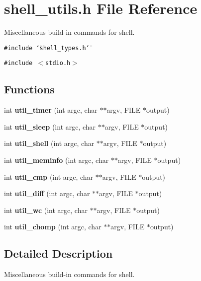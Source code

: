 \section{shell\_\-utils.h File Reference}
\label{shell__utils_8h}
Miscellaneous build-in commands for shell. 

{\tt \#include \char`\"{}shell\_\-types.h\char`\"{}}\par
{\tt \#include $<$stdio.h$>$}\par
\subsection*{Functions}
\begin{CompactItemize}
\item 
int {\bf util\_\-timer} (int argc, char $\ast$$\ast$argv, FILE $\ast$output)
\item 
int {\bf util\_\-sleep} (int argc, char $\ast$$\ast$argv, FILE $\ast$output)
\item 
int {\bf util\_\-shell} (int argc, char $\ast$$\ast$argv, FILE $\ast$output)
\item 
int {\bf util\_\-meminfo} (int argc, char $\ast$$\ast$argv, FILE $\ast$output)
\item 
int {\bf util\_\-cmp} (int argc, char $\ast$$\ast$argv, FILE $\ast$output)
\item 
int {\bf util\_\-diff} (int argc, char $\ast$$\ast$argv, FILE $\ast$output)
\item 
int {\bf util\_\-wc} (int argc, char $\ast$$\ast$argv, FILE $\ast$output)
\item 
int {\bf util\_\-chomp} (int argc, char $\ast$$\ast$argv, FILE $\ast$output)
\end{CompactItemize}


\subsection{Detailed Description}
Miscellaneous build-in commands for shell. 

